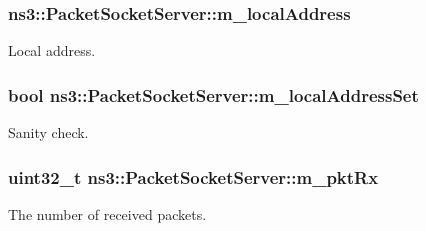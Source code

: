 \subsubsection[{\texorpdfstring{m\+\_\+local\+Address}{m_localAddress}}]{ ns3\+::\+Packet\+Socket\+Server\+::m\+\_\+local\+Address\hspace{0.3cm}{\ttfamily [private]}}\hypertarget{classns3_1_1PacketSocketServer_abf4811c14be356e6f72b533c808cab97}{}\label{classns3_1_1PacketSocketServer_abf4811c14be356e6f72b533c808cab97}


Local address. 

\subsubsection[{\texorpdfstring{m\+\_\+local\+Address\+Set}{m_localAddressSet}}]{\setlength{\rightskip}{0pt plus 5cm}bool ns3\+::\+Packet\+Socket\+Server\+::m\+\_\+local\+Address\+Set\hspace{0.3cm}{\ttfamily [private]}}\hypertarget{classns3_1_1PacketSocketServer_a3d7f93509397b5017f88b306f0cb0b81}{}\label{classns3_1_1PacketSocketServer_a3d7f93509397b5017f88b306f0cb0b81}


Sanity check. 

\subsubsection[{\texorpdfstring{m\+\_\+pkt\+Rx}{m_pktRx}}]{\setlength{\rightskip}{0pt plus 5cm}uint32\+\_\+t ns3\+::\+Packet\+Socket\+Server\+::m\+\_\+pkt\+Rx\hspace{0.3cm}{\ttfamily [private]}}\hypertarget{classns3_1_1PacketSocketServer_a48eb8835ae187f34b25dc02e442e1991}{}\label{classns3_1_1PacketSocketServer_a48eb8835ae187f34b25dc02e442e1991}


The number of received packets. 

